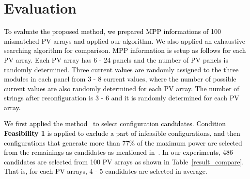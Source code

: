 \documentclass[conference]{pvsctran}
\newcommand{\michiko}{\textcolor{black}}
\newcommand{\zhao}{\textcolor{black}}
\begin{document}
\section{Evaluation}\label{Sec6}

\michiko{To evaluate the proposed method, we prepared MPP informations of 100 mismatched PV arrays and applied our algorithm. We also applied an exhaustive searching algorithm for comparison.
MPP information is setup as follows for each PV array. 
Each PV array has 6 - 24  panels and the number of PV panels is randomly determined. 
Three current values are randomly assigned to the three modules in each panel from 3 - 8 current values, where the number of possible current values are also randomly determined for each PV array.
The number of strings after reconfiguration is 3 - 6 and it is randomly determined for each PV array.}

\michiko{We first applied the method~\cite{orozco2016optimized} to select configuration candidates. Condition \textbf{Feasibility 1} is applied to exclude a part of infeasible configurations, and then configurations that generate more than 77\% of the maximum power are selected from the remainings as candidates as mentioned in~\cite{orozco2016optimized}.  In our experiments, 486 candidates are selected from 100 PV arrays as shown in Table~\ref{result_compare}. That is, for each PV arrays, 4 - 5 candidates are selected in average.}
\end{document}
